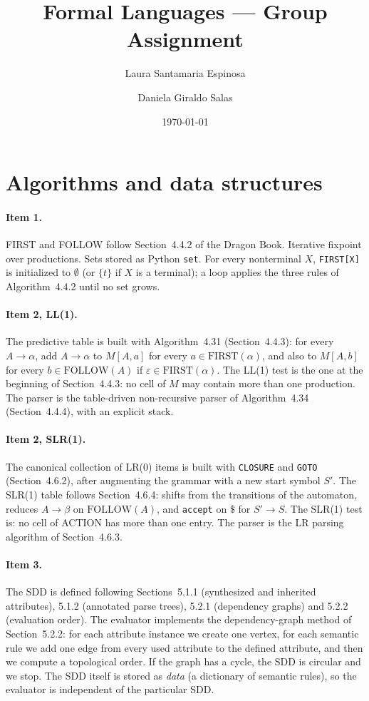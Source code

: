 \documentclass[11pt]{article}
\title{Formal Languages --- Group Assignment}
\author{Laura Santamaria Espinosa \and Daniela Giraldo Salas}
\date{\today}
\begin{document}
\maketitle

\section{Algorithms and data structures}
\paragraph{Item 1.} FIRST and FOLLOW follow Section~4.4.2 of the Dragon Book.
Iterative fixpoint over productions. Sets stored as Python \texttt{set}.
For every nonterminal $X$, \texttt{FIRST[X]} is initialized to $\emptyset$
(or $\{t\}$ if $X$ is a terminal); a loop applies the three rules of
Algorithm~4.4.2 until no set grows.

\paragraph{Item 2, LL(1).} The predictive table is built with Algorithm~4.31
(Section~4.4.3): for every $A\to\alpha$, add $A\to\alpha$ to $M[A,a]$ for every
$a\in\mathrm{FIRST}(\alpha)$, and also to $M[A,b]$ for every $b\in\mathrm{FOLLOW}(A)$
if $\varepsilon\in\mathrm{FIRST}(\alpha)$.
The LL(1) test is the one at the beginning of Section~4.4.3: no cell of $M$ may
contain more than one production. The parser is the table-driven non-recursive
parser of Algorithm~4.34 (Section~4.4.4), with an explicit stack.

\paragraph{Item 2, SLR(1).} The canonical collection of LR(0) items is built with
\texttt{CLOSURE} and \texttt{GOTO} (Section~4.6.2), after augmenting the grammar
with a new start symbol $S'$. The SLR(1) table follows Section~4.6.4: shifts from
the transitions of the automaton, reduces $A\to\beta$ on $\mathrm{FOLLOW}(A)$, and
\texttt{accept} on $\$$ for $S'\to S$. The SLR(1) test is: no cell of ACTION has
more than one entry. The parser is the LR parsing algorithm of Section~4.6.3.

\paragraph{Item 3.} The SDD is defined following Sections~5.1.1 (synthesized and
inherited attributes), 5.1.2 (annotated parse trees), 5.2.1 (dependency graphs)
and 5.2.2 (evaluation order). The evaluator implements the dependency-graph
method of Section~5.2.2: for each attribute instance we create one vertex, for
each semantic rule we add one edge from every used attribute to the defined
attribute, and then we compute a topological order. If the graph has a cycle,
the SDD is circular and we stop. The SDD itself is stored as \emph{data} (a
dictionary of semantic rules), so the evaluator is independent of the particular
SDD.
\end{document}
